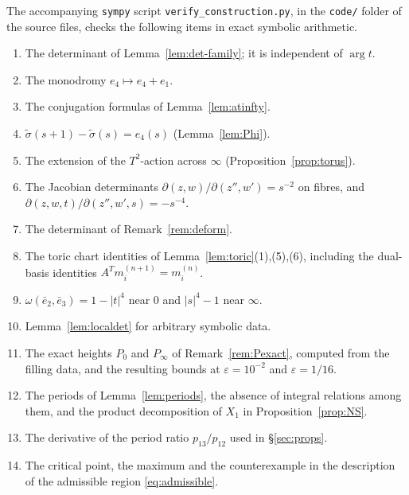 \documentclass{article}
\theoremstyle{definition}
\theoremstyle{plain}
\newcommand{\eb}{\bar e}
\begin{document}
The accompanying \texttt{sympy} script \texttt{verify\_construction.py}, in the
\texttt{code/} folder of the source files, checks the following items in exact symbolic
arithmetic.
\begin{enumerate}
\item The determinant of Lemma~\ref{lem:det-family}; it is independent of $\arg t$.
\item The monodromy $e_4\mapsto e_4+e_1$.
\item The conjugation formulas of Lemma~\ref{lem:atinfty}.
\item $\tilde\sigma(s+1)-\tilde\sigma(s)=e_4(s)$ (Lemma~\ref{lem:Phi}).
\item The extension of the $T^2$-action across $\infty$ (Proposition~\ref{prop:torus}).
\item The Jacobian determinants $\partial(z,w)/\partial(z'',w')=s^{-2}$ on
  fibres, and $\partial(z,w,t)/\partial(z'',w',s)=-s^{-4}$.
\item The determinant of Remark~\ref{rem:deform}.
\item The toric chart identities of Lemma~\ref{lem:toric}(1),(5),(6), including the
  dual-basis identities $A^Tm^{(n+1)}_i=m^{(n)}_i$.
\item $\omega(\eb_2,\eb_3)=1-|t|^4$ near $0$ and $|s|^4-1$ near $\infty$.
\item Lemma~\ref{lem:localdet} for arbitrary symbolic data.
\item The exact heights $P_0$ and $P_\infty$ of Remark~\ref{rem:Pexact}, computed
  from the filling data, and the resulting bounds at $\varepsilon=10^{-2}$ and
  $\varepsilon=1/16$.
\item The periods of Lemma~\ref{lem:periods}, the absence of integral relations among
  them, and the product decomposition of $X_1$ in Proposition~\ref{prop:NS}.
\item The derivative of the period ratio $p_{13}/p_{12}$ used in \S\ref{sec:props}.
\item The critical point, the maximum and the counterexample in the description of
  the admissible region \eqref{eq:admissible}.
\end{enumerate}
\end{document}
